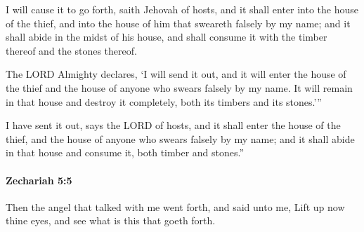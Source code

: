 			\begin{versebox}
					\item[BHS] 
					\item[LXX] 
					\item[ASV] I will cause it to go forth, saith Jehovah of hosts, and it shall enter into the house of the thief, and into the house of him that sweareth falsely by my name; and it shall abide in the midst of his house, and shall consume it with the timber thereof and the stones thereof.
					\item[NIV] The LORD Almighty declares, ‘I will send it out, and it will enter the house of the thief and the house of anyone who swears falsely by my name. It will remain in that house and destroy it completely, both its timbers and its stones.’”
					\item[NRSV] I have sent it out, says the LORD of hosts, and it shall enter the house of the thief, and the house of anyone who swears falsely by my name; and it shall abide in that house and consume it, both timber and stones.”
			\end{versebox}

		\paragraph{Zechariah 5:5} %
			\label{ZECHARIAH-5-5}

			Then the angel that talked with me went forth, and said unto me, Lift up now thine eyes, and see what is this that goeth forth.

